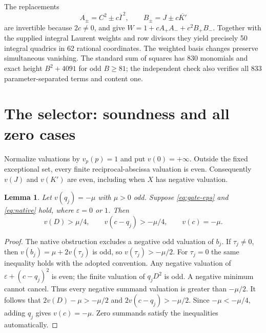 \documentclass[11pt,a4paper]{article}
\newtheorem{lemma}[theorem]{Lemma}
\begin{document}
The replacements
\[
 A_\pm=C^2\pm c\overline I^{\,2},\qquad
 B_\pm=J\pm c\overline {K'}
\]
are invertible because $2c\ne0$, and give
$W=1+cA_+A_-+c^2B_+B_-$. Together with the supplied integral Laurent
weights and row divisors they yield precisely 50 integral quadrics in
62 rational coordinates. The weighted basis changes preserve simultaneous
vanishing. The standard sum of squares has 830 monomials and exact
height $B^2+4091$ for odd $B\ge81$; the independent check also verifies
all 833 parameter-separated terms and content one.

\section{The selector: soundness and all zero cases}
Normalize valuations by $v_p(p)=1$ and put $v(0)=+\infty$.
Outside the fixed exceptional set, every finite reciprocal-abscissa
valuation is even. Consequently $v(J)$ and $v(K')$ are even, including
when $X$ has negative valuation.

\begin{lemma}\label{lem:gate}
Let $v(q_j)=-\mu$ with $\mu>0$ odd. Suppose \eqref{eq:gate-eps} and
\eqref{eq:native} hold, where $\varepsilon=0$ or $1$. Then
\[
 v(D)>\mu/4,\qquad v(c-q_j)>-\mu/4,\qquad v(c)=-\mu.
\]
\end{lemma}
\begin{proof}
The native obstruction excludes a negative odd valuation of $b_j$.
If $\tau_j\ne0$, then
$v(b_j)=\mu+2v(\tau_j)$ is odd, so $v(\tau_j)>-\mu/2$.
For $\tau_j=0$ the same inequality holds with the adopted convention.
Any negative valuation of $\varepsilon+(c-q_j)^2$ is even; the finite
valuation of $q_jD^2$ is odd. A negative minimum cannot cancel.
Thus every negative summand valuation is greater than $-\mu/2$.
It follows that $2v(D)-\mu>-\mu/2$ and
$2v(c-q_j)>-\mu/2$. Since $-\mu<-\mu/4$, adding $q_j$ gives
$v(c)=-\mu$. Zero summands satisfy the inequalities automatically.
\end{proof}
\end{document}
